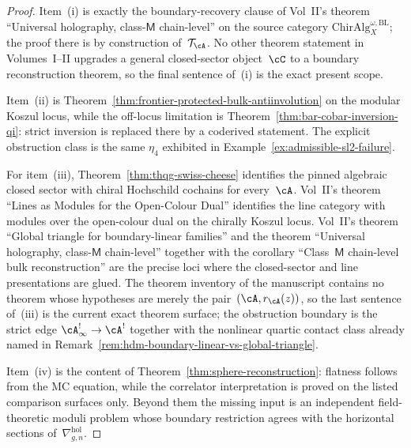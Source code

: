 \begin{proof}
Item~(i) is exactly the boundary-recovery clause of Vol~II's theorem
``Universal holography, class-$\mathsf{M}$ chain-level'' on the source category
$\mathrm{ChirAlg}^{\omega,\mathrm{BL}}_X$; the proof there is by
construction of~$\mathcal T_\cA$. No other theorem statement in
Volumes~I--II upgrades a general closed-sector object~$\cC$ to a boundary
reconstruction theorem, so the final sentence of~(i) is the exact
present scope.

Item~(ii) is Theorem~\ref{thm:frontier-protected-bulk-antiinvolution}
on the modular Koszul locus, while the off-locus limitation is
Theorem~\ref{thm:bar-cobar-inversion-qi}: strict inversion is replaced
there by a coderived statement. The explicit obstruction class is the
same $\eta_4$ exhibited in Example~\ref{ex:admissible-sl2-failure}.

For item~(iii), Theorem~\ref{thm:thqg-swiss-cheese} identifies the
pinned algebraic closed sector with chiral Hochschild cochains for every~$\cA$.
Vol~II's theorem ``Lines as Modules for the Open-Colour Dual''
identifies the line category with modules over the open-colour dual on
the chirally Koszul locus. Vol~II's theorem ``Global triangle for
boundary-linear families'' and the theorem ``Universal holography,
class-$\mathsf{M}$ chain-level'' together with the corollary
``Class~$\mathsf{M}$ chain-level bulk reconstruction'' are the precise
loci where the closed-sector and line presentations are glued. The
theorem inventory of the manuscript contains no theorem whose hypotheses are merely the
pair~$(\cA,r_\cA(z))$, so the last sentence of~(iii) is the current exact
theorem surface; the obstruction boundary is the strict edge
$\cA^{!}_\infty\to\cA^!$ together with the nonlinear quartic contact
class already named in Remark~\ref{rem:hdm-boundary-linear-vs-global-triangle}.

Item~(iv) is the content of
Theorem~\ref{thm:sphere-reconstruction}: flatness follows from the MC
equation, while the correlator interpretation is proved on the listed
comparison surfaces only. Beyond them the missing input is an
independent field-theoretic moduli problem whose boundary restriction agrees
with the horizontal sections of~$\nabla^{\mathrm{hol}}_{g,n}$.
\end{proof}

